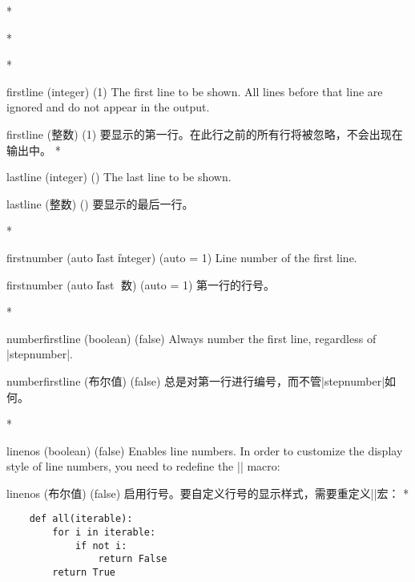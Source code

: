 \begin{optionlist}
\begin{paracol}{2}





\switchcolumn[0]*%

    
\switchcolumn

\switchcolumn[0]*%
  


\switchcolumn[0]*%
\item[firstline (integer) (1)]
The first line to be shown.
All lines before that line are ignored and do not appear in the output.
\switchcolumn
\item[firstline (整数) (1)]
要显示的第一行。在此行之前的所有行将被忽略，不会出现在输出中。
\switchcolumn[0]*%
\item[lastline (integer) (\meta{last line of input})]
The last line to be shown.
\switchcolumn
\item[lastline (整数) (\meta{输入的最后一行})]
要显示的最后一行。

\switchcolumn[0]*%
\item[firstnumber (auto \| last \| integer) (auto = 1)]
Line number of the first line.
\switchcolumn
\item[firstnumber (auto \| last \| 整数) (auto = 1)]
第一行的行号。

\switchcolumn[0]*%
\item[numberfirstline (boolean) (false)]
Always number the first line, regardless of |stepnumber|.
\switchcolumn
\item[numberfirstline (布尔值) (false)]
 总是对第一行进行编号，而不管|stepnumber|如何。


 \switchcolumn[0]*%
  \item[linenos (boolean) (false)]
    Enables line numbers.
    In order to customize the display style of line numbers, you need to redefine the |\theFancyVerbLine| macro:
    \switchcolumn
    \item[linenos (布尔值) (false)]
    启用行号。要自定义行号的显示样式，需要重定义|\theFancyVerbLine|宏：
    \switchcolumn[0]*%
\begin{example}
    \renewcommand{\theFancyVerbLine}{\sffamily
        \textcolor[rgb]{0.5,0.5,1.0}{\scriptsize
        \oldstylenums{\arabic{FancyVerbLine}}}}

    \begin{verbatim}
    def all(iterable):
        for i in iterable:
            if not i: 
                return False
        return True
    \end{verbatim}
\end{example}


\end{paracol}
\end{optionlist}
